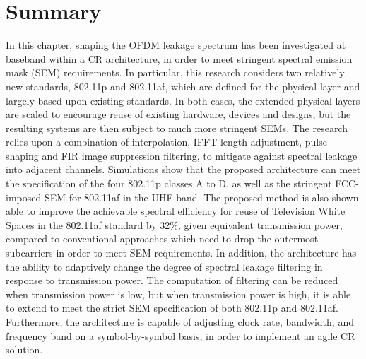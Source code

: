 \section{Summary}
In this chapter, shaping the OFDM leakage spectrum has been investigated at baseband within a CR architecture, in order to meet stringent spectral emission mask (SEM) requirements.
In particular, this research considers two relatively new standards, 802.11p and 802.11af, which are defined for the physical layer and largely based upon existing standards.
In both cases, the extended physical layers are scaled to encourage reuse of existing hardware, devices and designs, but the resulting systems are then subject to much more stringent SEMs.
The research relies upon a combination of interpolation, IFFT length adjustment, pulse shaping and FIR image suppression filtering, to mitigate against spectral leakage into adjacent channels.
Simulations show that the proposed architecture can meet the specification of the four 802.11p classes A to D, as well as the stringent FCC-imposed SEM for 802.11af in the UHF
band.
The proposed method is also shown able to improve the achievable spectral efficiency for reuse of Television White Spaces in the 802.11af standard by 32\%, given equivalent transmission power, compared to conventional approaches which need to drop the outermost subcarriers in order to meet SEM requirements.
In addition, the architecture has the ability to adaptively change the degree of spectral leakage filtering in response to transmission power.
The computation of filtering can be reduced when transmission power is low, but when transmission power is high, it is able to extend to meet the strict SEM specification of both 802.11p and 802.11af.
Furthermore, the architecture is capable of adjusting clock rate, bandwidth, and frequency band on a symbol-by-symbol basis, in order to implement an agile CR solution.
